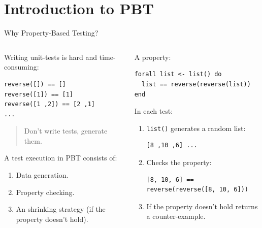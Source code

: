 \documentclass[aspectratio=169, 10pt]{beamer}
\begin{document}
\whitetheme

\section{Introduction to PBT}
\label{sec:org6870d63}
\begin{frame}[label={sec:orgf47aa55},fragile]{Why Property-Based Testing?}
 \begin{columns}
\begin{column}{0.48\columnwidth}
\onslide<+->
\onslide<+->
Writing unit-tests is hard and time-consuming:
\onslide<+->
\lstset{language=elixir,label= ,caption= ,captionpos=b,numbers=none,style=display}
\begin{lstlisting}
reverse([]) == []
reverse([1]) == [1]
reverse([1 ,2]) == [2 ,1]
...
\end{lstlisting}
\vspace{10pt}
\onslide<+->
\begin{quote}
Don't write tests, generate them.
\end{quote}
\onslide<+->
A test execution in PBT consists of:
\onslide<+->
\begin{enumerate}
\item Data generation.
\onslide<+->
\item Property checking.
\onslide<+->
\item An shrinking strategy (if the property doesn't hold).
\onslide<+->
\end{enumerate}
\end{column}

\begin{column}{0.48\columnwidth}
A property:
\onslide<+->
\lstset{language=elixir,label= ,caption= ,captionpos=b,numbers=none,style=display}
\begin{lstlisting}
forall list <- list() do
  list == reverse(reverse(list))
end
\end{lstlisting}
In each test:
\begin{enumerate}
\item \texttt{list()} generates a random list:
\onslide<+->
\lstset{language=elixir,label= ,caption= ,captionpos=b,numbers=none,style=display}
\begin{lstlisting}
[8 ,10 ,6] ...
\end{lstlisting}
\item Checks the property:
\onslide<+->
\lstset{language=elixir,label= ,caption= ,captionpos=b,numbers=none,style=display}
\begin{lstlisting}
[8, 10, 6] == reverse(reverse([8, 10, 6]))
\end{lstlisting}
\onslide<+->
\item If the property doesn't hold returns a counter-example.
\end{enumerate}
\end{column}
\end{columns}
\end{frame}
\end{document}
